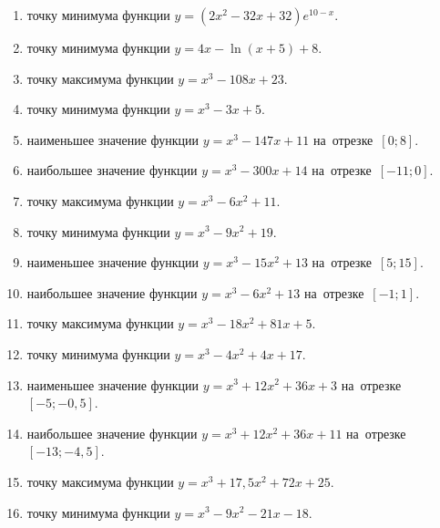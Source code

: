 \documentclass[a4paper,10pt]{article}
\begin{document}
\begin{enumerate}
\item {} точку минимума функции $y=\left(2x^2-32x+32\right){{e}^{10-x}}$.

\item {} точку минимума функции $y=4x-\ln \left(x+5\right)+8$.

\item {} точку максимума функции $y=x^3 -108x +23$.

\item {} точку минимума функции $y=x^3 -3x+5$.

\item {} наименьшее значение функции $y=x^3 -147x+11$ на~отрезке~$\left[0;8\right]$.

\item {} наибольшее значение функции $y=x^3 -300x+14$ на~отрезке~$\left[-11;0\right]$.

\item {} точку максимума функции $y=x^3 -6x^2+11$.

\item {} точку минимума функции $y=x^3 -9x^2+19$.

\item {} наименьшее значение функции $y=x^3 -15x^2+13$ на~отрезке~$\left[5;15\right]$.

\item {} наибольшее значение функции $y=x^3 -6x^2+13$ на~отрезке~$\left[-1;1\right]$.

\item {} точку максимума функции $y=x^3 -18x^2+81x+5$.

\item {} точку минимума функции $y=x^3 -4x^2+4x+17$.

\item {} наименьшее значение функции $y=x^3 +12x^2+36x+3$ на~отрезке~$\left[-5;-0,5\right]$.

\item {} наибольшее значение функции $y=x^3 +12x^2+36x+11$ на~отрезке~$\left[-13;-4,5\right]$.

\item {} точку максимума функции $y=x^3 +17,5x^2+72x+25$.

\item {} точку минимума функции $y=x^3 -9x^2-21x-18$.


\end{enumerate}
\end{document}

